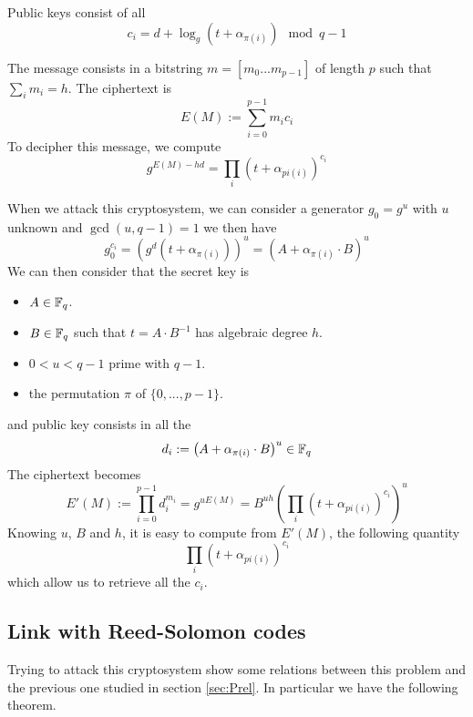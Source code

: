 \documentclass[12pt,a4paper,titlepage]{article}
\begin{document}
Public keys consist of all
$$ c_i = d + \log_g(t + \alpha_{\pi(i)}) \mod q-1 $$

The message consists in a bitstring $m = [m_0...m_{p-1}]$ of length $p$ such that $\sum_i m_i = h$. The ciphertext is
$$ E(M) := \sum_{i=0}^{p-1} m_i c_i$$
To decipher this message, we compute
$$ g^{E(M) - hd} =  \prod_i \left( t + \alpha_{pi(i)}\right)^{c_i} $$




When we attack this cryptosystem, we can consider a generator $g_0 = g^u$ with $u$ unknown and $\gcd(u, q-1) = 1$ we then have
$$ g_0^{c_i} = \left( g^d \left( t + \alpha_{\pi(i)} \right) \right)^u = \left(A + \alpha_{\pi(i)} \cdot B\right)^u$$
We can then consider that the secret key is
\begin{itemize}
\item $A \in \mathbb{F}_q$.
\item $B \in \mathbb{F}_q$ such that $t = A\cdot B^{-1}$ has algebraic degree $h$.
\item $0 < u < q-1$ prime with $q-1$.
\item the permutation $\pi$ of $\{ 0, ... , p-1 \}$.
\end{itemize}
and public key consists in all the
$$ d_i := \left(A + \alpha_{\pi(i)} \cdot B\right)^u \in \mathbb{F}_q$$
The ciphertext becomes
$$ E'(M) := \prod_{i=0}^{p-1} d_i^{m_i} = g^{uE(M)} = B^{uh} \left( \prod_i \left( t + \alpha_{pi(i)}\right)^{c_i} \right)^u$$
Knowing $u$, $B$ and $h$, it is easy to compute from $E'(M)$, the following quantity
$$ \prod_i \left( t + \alpha_{pi(i)}\right)^{c_i} $$
which allow us to retrieve all the $c_i$.


\subsection{Link with Reed-Solomon codes}

Trying to attack this cryptosystem show some relations between this problem and the previous one studied in section \ref{sec:Prel}. In particular we have the following theorem.
\end{document}
